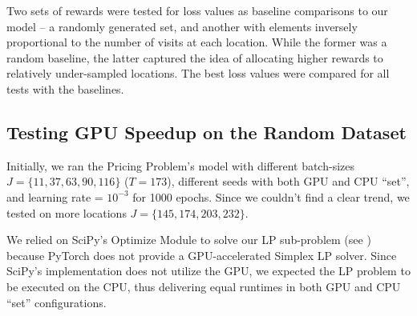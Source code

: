 Two sets of rewards were tested for loss values as baseline comparisons to our model -- a randomly generated set, and another with elements inversely proportional to the number of visits at each location. While the former was a random baseline, the latter captured the idea of allocating higher rewards to relatively under-sampled locations. The best loss values were compared for all tests with the baselines.

\subsection{Testing GPU Speedup on the Random Dataset} \label{sec:Pricing Problem-Testing GPU Speedup on the Random Dataset}
Initially, we ran the Pricing Problem's model with different batch-sizes $J = \{11, 37, 63, 90, 116\}$ ($T = 173$), different seeds with both GPU and CPU ``set'', and learning rate = $10^{-3}$ for 1000 epochs. Since we couldn't find a clear trend, we tested on more locations $J = \{145, 174, 203, 232\}$.

We relied on SciPy's Optimize Module to solve our LP sub-problem (see ) because PyTorch does not provide a GPU-accelerated Simplex LP solver. Since SciPy's implementation does not utilize the GPU, we expected the LP problem to be executed on the CPU, thus delivering equal runtimes in both GPU and CPU ``set'' configurations.